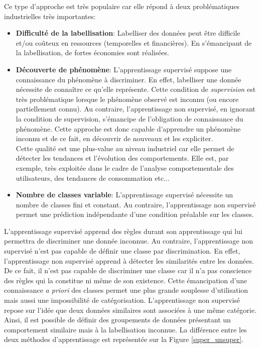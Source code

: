 \noindent Ce type d'approche est très populaire car elle répond à deux problématiques industrielles très importantes:
\begin{itemize}
    \item \textbf{Difficulté de la labellisation}: Labelliser des données peut être difficile et/ou coûteux en ressources (temporelles et financières). En s'émancipant de la labellisation, de fortes économies sont réalisées.

    \item \textbf{Découverte de phénomène}: L'apprentissage supervisé suppose une connaissance du phénomène à discriminer. En effet, labelliser une donnée nécessite de connaître ce qu'elle représente. Cette condition de \textit{supervision} est très problématique lorsque le phénomène observé est inconnu (ou encore partiellement connu). Au contraire, l'apprentissage non supervisé, en ignorant la condition de supervision, s'émancipe de l'obligation de connaissance du phénomène. Cette approche est donc capable d'apprendre un phénomène inconnu et de ce fait, en découvrir de nouveaux et les expliciter. \\

    \noindent Cette qualité est une plus-value au niveau industriel car elle permet de détecter les tendances  et l'évolution des comportements. Elle est, par exemple, très exploitée dans le cadre de l'analyse comportementale des utilisateurs, des tendances de consommation etc...

    \item \textbf{Nombre de classes variable}: L'apprentissage supervisé nécessite un nombre de classes fini et constant. Au contraire, l'apprentissage non supervisé permet une prédiction indépendante d'une condition préalable sur les classes.
\end{itemize}

\noindent L'apprentissage supervisé apprend des règles durant son apprentissage qui lui permettra de discriminer une donnée inconnue. Au contraire, l'apprentissage non supervisé n'est pas capable de définir une classe par discrimination. En effet, l'apprentissage non supervisé apprend à détecter les similarités entre les données. De ce fait, il n'est pas capable de discriminer une classe car il n'a pas conscience des règles qui la constitue ni même de son existence. Cette émancipation d'une connaissance \textit{a priori} des classes permet une plus grande souplesse d'utilisation mais aussi une impossibilité de catégorisation. L'apprentissage non supervisé repose sur l'idée que deux données similaires sont associées à une même catégorie. Ainsi, il est possible de définir des groupements de données présentant un comportement similaire mais à la labellisation inconnue. La différence entre les deux méthodes d'apprentissage est représentée sur la Figure \ref{super_unsuper}.\\

